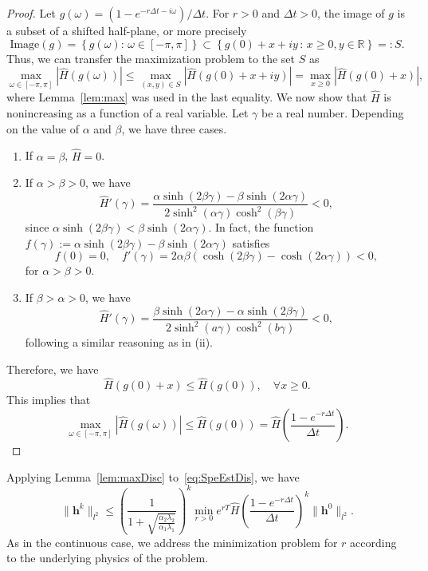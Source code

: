 \documentclass[reqno]{amsart}
\begin{document}
\begin{proof}
Let $g(\omega) =(1-e^{-r \Delta t - i \omega})/ \Delta t$. For $r>0$ and $\Delta t>0$, the image of $g$ is a subset of a shifted half-plane, or more precisely
\[\text{Image}(g) = \left\{g(\omega): \, \omega \in [-\pi,\pi]\right\} \subset \left\{g(0) + x + iy \, : \,x\geq 0, y \in \mathbb{R} \right\} =: S.\]
Thus, we can transfer the maximization problem to the set $S$ as
\[\max_{\omega \in [-\pi,\pi]} \left| \hat{H}\left(g(\omega)\right) \right| \leq \max_{(x,y) \in S} \left| \hat{H} \left(g(0) + x + iy\right) \right| 
=  \max_{x \geq 0} \left| \hat H \left(g(0) + x\right) \right|,\]
where Lemma~\ref{lem:max} was used in the last equality. We now show that $\hat H$ is nonincreasing as a function of a real variable. Let $\gamma$ be a real number. Depending on the value of $\alpha$ and $\beta$, we have three cases.

\begin{enumerate}
\item[(i)] If $\alpha=\beta$, $\hat H = 0$. 

\item[(ii)] If $\alpha>\beta>0$, we have
\[\hat{H}'(\gamma) = \frac{\alpha \sinh(2 \beta \gamma) - \beta \sinh(2\alpha \gamma)}{2 \sinh^2(\alpha \gamma) \cosh^2(\beta \gamma)} < 0,\]
since $\alpha \sinh(2 \beta \gamma) < \beta \sinh(2\alpha \gamma)$. In fact, the function $f(\gamma) := \alpha \sinh(2 \beta \gamma) - \beta \sinh(2\alpha \gamma)$ satisfies
\[f(0) = 0, \quad f'(\gamma) = 2\alpha\beta(\cosh(2 \beta \gamma)-\cosh(2 \alpha \gamma)) < 0,\] 
for $\alpha > \beta >0$. 

\item[(iii)] If $\beta>\alpha>0$, we have
\[\hat{H}'(\gamma) = \frac{\beta \sinh(2 \alpha \gamma) -\alpha \sinh(2\beta \gamma)}{2 \sinh^2(a \gamma) \cosh^2(b \gamma)} < 0,\]
following a similar reasoning as in (ii). 
\end{enumerate}
Therefore, we have
\[\hat{H} \left(g(0) + x\right) \leq  \hat{H} \left(g(0)\right),
\quad \forall x \geq 0.\] 
This implies that
\[\max_{\omega \in [-\pi,\pi]} \left| \hat{H}\left(g(\omega)\right) \right|	
\leq \hat{H}\left(g(0)\right) = \hat{H}\left( \frac{1-e^{-r\Delta t}}{\Delta t} \right).\] 
\end{proof}


Applying Lemma~\ref{lem:maxDisc} to~\eqref{eq:SpeEstDis}, we have 
\begin{equation}\label{eq:min-disc}
\|\boldsymbol{h}^k\|_{l^2} \leq \left(\frac{1}{1+\sqrt{\frac{\alpha_2\lambda_2}{\alpha_1\lambda_1}}}\right)^k \min_{r > 0} e^{rT} \hat H\left(\frac{1-e^{-r \Delta t}}{\Delta t}\right)^k \|\boldsymbol{h}^0\|_{l^2}.
\end{equation}
As in the continuous case, we address the minimization problem for $r$ according to the underlying physics of the problem.
\end{document}
